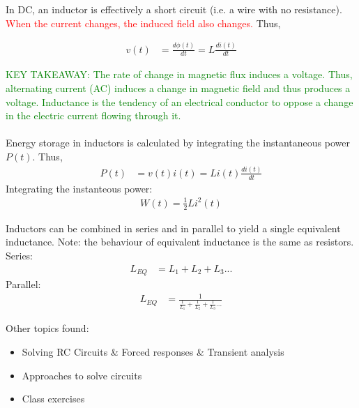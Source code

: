In DC, an inductor is effectively a short circuit (i.e. a wire with no resistance). \textcolor{red}{When the current changes, the induced field also changes.} Thus,

\begin{align}
  v(t) &= \frac{d\phi(t)}{dt} = L \frac{di(t)}{dt}
\end{align}

\textcolor{green}{KEY TAKEAWAY: The rate of change in magnetic flux induces a voltage. Thus, alternating current (AC) induces a change in magnetic field and thus produces a voltage. Inductance is the tendency of an electrical conductor to oppose a change in the electric current flowing through it.}\\
\\
Energy storage in inductors is calculated by integrating the instantaneous power $P(t)$. Thus,
\begin{align}
  P(t) &= v(t)i(t) = Li(t)\frac{di(t)}{dt}
\end{align}
Integrating the instanteous power:
\begin{align}
  W(t) = \frac{1}{2}Li^2(t)
\end{align}

Inductors can be combined in series and in parallel to yield a single equivalent inductance. Note: the behaviour of equivalent inductance is the same as resistors. Series:
\begin{align}
  L_{EQ} &= L_1 + L_2 + L_3 ...
\end{align}
Parallel:
\begin{align}
  L_{EQ} &= \frac{1}{\frac{1}{L_1} + \frac{1}{L_2} + \frac{1}{L_3} ...}
\end{align}

Other topics found:
\begin{itemize}
  \item Solving RC Circuits \& Forced responses \& Transient analysis
  \item Approaches to solve circuits
  \item Class exercises
\end{itemize}
\clearpage

